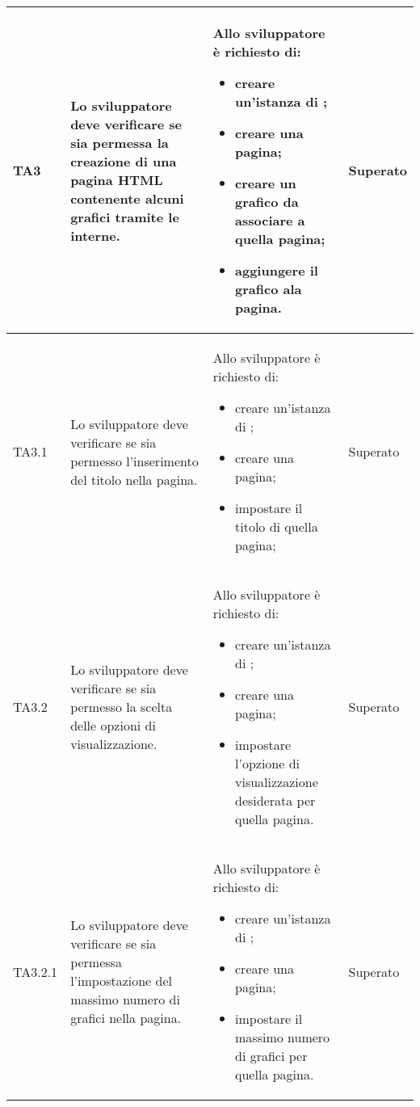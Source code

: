 \begin{longtabu}{| X[0.5] | X | X | X[0.5] |}
	TA3 & Lo sviluppatore deve verificare se sia permessa la creazione di una pagina HTML contenente alcuni grafici tramite le  interne.
		
		& Allo sviluppatore è richiesto di:
		\begin{itemize}
			\item creare un'istanza di \projectname{};
			\item creare una pagina;
			\item creare un grafico da associare a quella pagina;
			\item aggiungere il grafico ala pagina.
		\end{itemize}
& Superato \\ \hline

	TA3.1 & Lo sviluppatore deve verificare se sia permesso l'inserimento del titolo nella pagina.
		
		& Allo sviluppatore è richiesto di:
		\begin{itemize}
			\item creare un'istanza di \projectname{};
			\item creare una pagina;
			\item impostare il titolo di quella pagina;
		\end{itemize}
& Superato \\ \hline

	TA3.2 & Lo sviluppatore deve verificare se sia permesso la scelta delle opzioni di visualizzazione.
		
		& Allo sviluppatore è richiesto di:
		\begin{itemize}
			\item creare un'istanza di \projectname{};
			\item creare una pagina;
			\item impostare l'opzione di visualizzazione desiderata per quella pagina.
		\end{itemize}
& Superato \\ \hline

	TA3.2.1 & Lo sviluppatore deve verificare se sia permessa l'impostazione del massimo numero di grafici nella pagina.
		
		& Allo sviluppatore è richiesto di:
		\begin{itemize}
			\item creare un'istanza di \projectname{};
			\item creare una pagina;
			\item impostare il massimo numero di grafici per quella pagina.
		\end{itemize}
& Superato \\ \hline


\end{longtabu}
